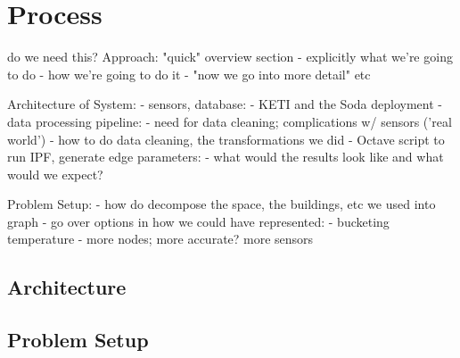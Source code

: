 \section{Process}


do we need this?
Approach: "quick" overview section
- explicitly what we're going to do
- how we're going to do it
- "now we go into more detail" etc

Architecture of System:
- sensors, database:
    - KETI and the Soda deployment
- data processing pipeline:
    - need for data cleaning; complications w/ sensors ('real world')
    - how to do data cleaning, the transformations we did
- Octave script to run IPF, generate edge parameters:
    - what would the results look like and what would we expect?

Problem Setup:
- how do decompose the space, the buildings, etc we used into graph
- go over options in how we could have represented:
    - bucketing temperature
    - more nodes; more accurate? more sensors
\fi


\subsection{Architecture}

\subsection{Problem Setup}
